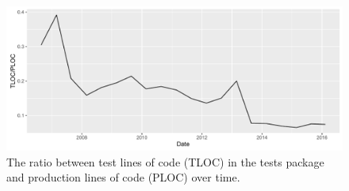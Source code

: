 \begin{figure}[h!]
	\centering
	\includegraphics[width=1.0\columnwidth]{images/problem_description/tests_ratio_tribler}
	\caption{The ratio between test lines of code (TLOC) in the tests package and production lines of code (PLOC) over time.}
	\label{fig:tests-ratio-tribler}
\end{figure}

